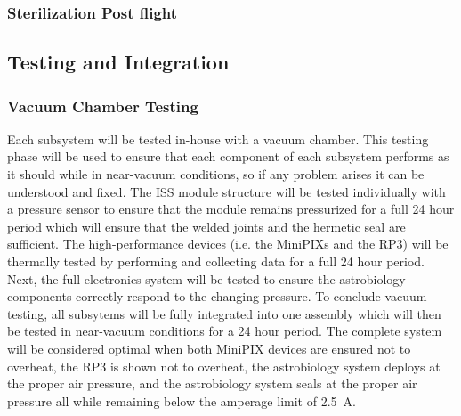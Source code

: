 \subsubsection{Sterilization Post flight}


\subsection{Testing and Integration}

\subsubsection{Vacuum Chamber Testing}
Each subsystem will be tested in-house with a vacuum chamber.
This testing phase will be used to ensure that each component of each subsystem performs as it should while in near-vacuum conditions, so if any problem arises it can be understood and fixed.
The ISS module structure will be tested individually with a pressure sensor to ensure that the module remains pressurized for a full \num{24} hour period which will ensure that the welded joints and the hermetic seal are sufficient.
The high-performance devices (i.e. the MiniPIXs and the RP3) will be thermally tested by performing and collecting data for a full \num{24} hour period.
Next, the full electronics system will be tested to ensure the astrobiology components correctly respond to the changing pressure.
To conclude vacuum testing, all subsytems will be fully integrated into one assembly which will then be tested in near-vacuum conditions for a \num{24} hour period.
The complete system will be considered optimal when both MiniPIX devices are ensured not to overheat, the RP3 is shown not to overheat, the astrobiology system deploys at the proper air pressure, and the astrobiology system seals at the proper air pressure all while remaining below the amperage limit of \SI{2.5}{\ampere}.


